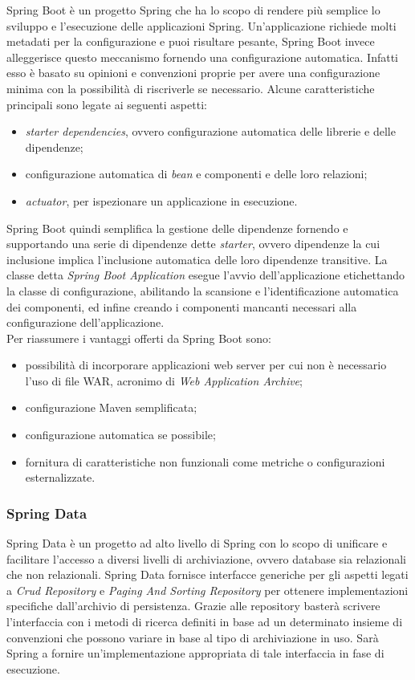 Spring Boot è un progetto Spring che ha lo scopo di rendere più semplice lo sviluppo e l'esecuzione delle applicazioni Spring. Un'applicazione richiede molti metadati per la configurazione e puoi risultare pesante, Spring Boot invece alleggerisce questo meccanismo fornendo una configurazione automatica. Infatti esso è basato su opinioni e convenzioni proprie per avere una configurazione minima con la possibilità di riscriverle se necessario. Alcune caratteristiche principali sono legate ai seguenti aspetti:
\begin{itemize}
	\item \textit{starter dependencies}, ovvero configurazione automatica delle librerie e delle dipendenze;
	\item configurazione automatica di \textit{bean} e componenti e delle loro relazioni;
	\item \textit{actuator}, per ispezionare un applicazione in esecuzione.
\end{itemize} 
Spring Boot quindi semplifica la gestione delle dipendenze fornendo e supportando una serie di dipendenze dette \textit{starter}, ovvero dipendenze la cui inclusione implica l'inclusione automatica delle loro dipendenze transitive. La classe detta \textit{Spring Boot Application} esegue l'avvio dell'applicazione etichettando la classe di configurazione, abilitando la scansione e l'identificazione automatica dei componenti, ed infine creando i componenti mancanti necessari alla configurazione dell'applicazione.\\
Per riassumere i vantaggi offerti da Spring Boot sono:
\begin{itemize}
	\item possibilità di incorporare applicazioni web server per cui non è necessario l'uso di file WAR, acronimo di \textit{Web Application Archive};
	\item configurazione Maven semplificata;
	\item configurazione automatica se possibile;
	\item fornitura di caratteristiche non funzionali come metriche o configurazioni esternalizzate.
\end{itemize}

\subsubsection{Spring Data}
Spring Data è un progetto ad alto livello di Spring con lo scopo di unificare e facilitare l'accesso a diversi livelli di archiviazione, ovvero database sia relazionali che non relazionali. Spring Data fornisce interfacce generiche per gli aspetti legati a \textit{Crud Repository} e \textit{Paging And Sorting Repository} per ottenere implementazioni specifiche dall'archivio di persistenza. Grazie alle repository basterà scrivere l'interfaccia con i metodi di ricerca definiti in base ad un determinato insieme di convenzioni che possono variare in base al tipo di archiviazione in uso. Sarà Spring  a fornire un'implementazione appropriata di tale interfaccia in fase di esecuzione.

